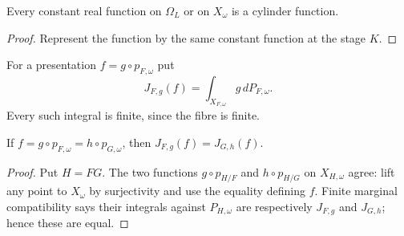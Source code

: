 \begin{lemma}\label{lem:cylinder-constants}
\leanok
{}
Every constant real function on $\Omega_L$ or on $X_\omega$ is a cylinder
function.
\end{lemma}
\begin{proof}
Represent the function by the same constant function at the stage $K$.
\end{proof}

\begin{definition}\label{def:cylinder-integral}
\leanok
{}
For a presentation $f=g\circ p_{F,\omega}$ put
\[
 J_{F,g}(f)=\int_{X_{F,\omega}}g\,dP_{F,\omega}.
\]
Every such integral is finite, since the fibre is finite.
\end{definition}

\begin{lemma}\label{lem:cylinder-integral-independent}
\leanok
{}
If $f=g\circ p_{F,\omega}=h\circ p_{G,\omega}$, then
$J_{F,g}(f)=J_{G,h}(f)$.
\end{lemma}
\begin{proof}
Put $H=FG$. The two functions $g\circ p_{H/F}$ and $h\circ p_{H/G}$
on $X_{H,\omega}$ agree: lift any point to $X_\omega$ by surjectivity
and use the equality defining $f$. Finite marginal compatibility says
their integrals against $P_{H,\omega}$ are respectively $J_{F,g}$ and
$J_{G,h}$; hence these are equal.
\end{proof}

